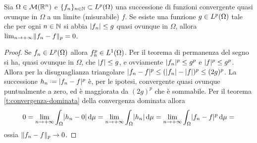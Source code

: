 \begin{teorema} \label{t:convergenza-dominata-Lp}
    Sia $\Omega\in\mis(\R^n)$ e $\{f_n\}_{n\in\N}\subset\leb[p]{\Omega}$ una successione di funzioni convergente quasi ovunque in $\Omega$ a un limite (misurabile) $f$.
    Se esiste una funzione $g\in\leb[p]{\Omega}$ tale che per ogni $n\in\N$ si abbia $\abs{f_n}\le g$ quasi ovunque in $\Omega$, allora $\lim_{n\to+\infty}\norm{f_n-f}_p=0$.
\end{teorema}
\begin{proof}
    Se $f_n\in\leb[p]{\Omega}$ allora $f_n^p\in\leb[1]{\Omega}$.
    Per il teorema di permanenza del segno si ha, quasi ovunque in $\Omega$, che $\abs{f}\le g$, e ovviamente $\abs{f_n}^p\le g^p$ e $\abs{f}^p\le g^p$.
    Allora per la disuguaglianza triangolare $\abs{f_n-f}^p\le(\abs{f_n}-\abs{f})^p\le(2g)^p$.
    La successione $h_n\defeq\abs{f_n-f}^p$ è, per le ipotesi, convergente quasi ovunque puntualmente a zero, ed è maggiorata da $(2g)^p$ che è sommabile.
    Per il teorema \ref{t:convergenza-dominata} della convergenza dominata allora
    \begin{equation}
        0=\lim_{n\to+\infty}\int_\Omega\abs{h_n-0}\,\dd\mu=
        \lim_{n\to+\infty}\int_\Omega\abs{h_n}\,\dd\mu=
        \lim_{n\to+\infty}\int_\Omega\abs{f_n-f}^p\,\dd\mu=
    \end{equation}
    ossia $\norm{f_n-f}_p\to 0$.
\end{proof}

